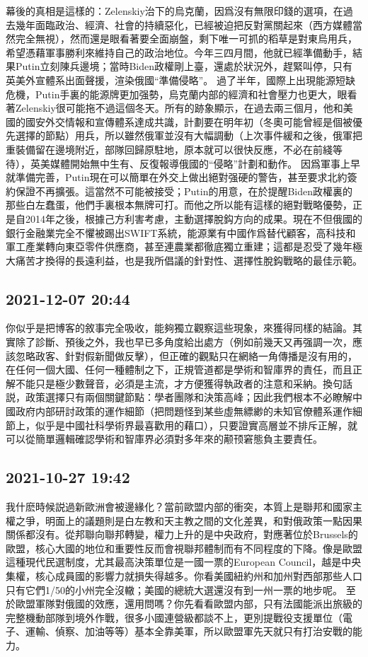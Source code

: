\documentclass[twocolumn]{ctexart}
\begin{document}
幕後的真相是這樣的：Zelenskiy治下的烏克蘭，因爲沒有無限印錢的選項，在過去幾年面臨政治、經濟、社會的持續惡化，已經被迫把反對黨關起來（西方媒體當然完全無視），然而還是眼看著要全面崩盤，剩下唯一可抓的稻草是對東烏用兵，希望憑藉軍事勝利來維持自己的政治地位。今年三四月間，他就已經準備動手，結果Putin立刻陳兵邊境；當時Biden政權剛上臺，還處於狀況外，趕緊叫停，只有英美外宣體系出面聲援，渲染俄國“準備侵略”。
過了半年，國際上出現能源短缺危機，Putin手裏的能源牌更加强勢，烏克蘭内部的經濟和社會壓力也更大，眼看著Zelenskiy很可能拖不過這個冬天。所有的跡象顯示，在過去兩三個月，他和美國的國安外交情報和宣傳體系達成共識，計劃要在明年初（冬奧可能曾經是個被優先選擇的節點）用兵，所以雖然俄軍並沒有大幅調動（上次事件緩和之後，俄軍把重裝備留在邊境附近，部隊回歸原駐地，原本就可以很快反應，不必在前綫等待），英美媒體開始無中生有、反復報導俄國的“侵略”計劃和動作。
因爲軍事上早就準備完善，Putin現在可以簡單在外交上做出絕對强硬的警告，甚至要求北約簽約保證不再擴張。這當然不可能被接受；Putin的用意，在於提醒Biden政權裏的那些白左蠢蛋，他們手裏根本無牌可打。而他之所以能有這樣的絕對戰略優勢，正是自2014年之後，根據己方利害考慮，主動選擇脫鈎方向的成果。現在不但俄國的銀行金融業完全不懼被踢出SWIFT系統，能源業有中國作爲替代顧客，高科技和軍工產業轉向東亞零件供應商，甚至連農業都徹底獨立重建；這都是忍受了幾年極大痛苦才換得的長遠利益，也是我所倡議的針對性、選擇性脫鈎戰略的最佳示範。
\subsection*{2021-12-07 20:44}

你似乎是把博客的敘事完全吸收，能夠獨立觀察這些現象，來獲得同樣的結論。其實除了診斷、預後之外，我也早已多角度給出處方（例如前幾天又再强調一次，應該忽略政客、針對假新聞做反擊），但正確的觀點只在網絡一角傳播是沒有用的，在任何一個大國、任何一種體制之下，正規管道都是學術和智庫界的責任，而且正解不能只是極少數聲音，必須是主流，才方便獲得執政者的注意和采納。換句話説，政策選擇只有兩個關鍵節點：學者團隊和決策高峰；因此我們根本不必瞭解中國政府内部研討政策的運作細節（把問題怪到某些虛無縹緲的未知官僚體系運作細節上，似乎是中國社科學術界最喜歡用的藉口），只要證實高層並不排斥正解，就可以從簡單邏輯確認學術和智庫界必須對多年來的颟顸窘態負主要責任。
\subsection*{2021-10-27 19:42}

我什麽時候説過新歐洲會被邊緣化？當前歐盟内部的衝突，本質上是聯邦和國家主權之爭，明面上的議題則是白左教和天主教之間的文化差異，和對俄政策一點因果關係都沒有。從邦聯向聯邦轉變，權力上升的是中央政府，對應著位於Brussels的歐盟，核心大國的地位和重要性反而會視聯邦體制而有不同程度的下降。像是歐盟這種現代民選制度，尤其最高決策單位是一國一票的European Council，越是中央集權，核心成員國的影響力就損失得越多。你看美國紐約州和加州對西部那些人口只有它們1/50的小州完全沒轍；美國的總統大選還沒有到一州一票的地步呢。
至於歐盟軍隊對俄國的效應，還用問嗎？你先看看歐盟内部，只有法國能派出旅級的完整機動部隊到境外作戰，很多小國連營級都談不上，更別提戰役支援單位（電子、運輸、偵察、加油等等）基本全靠美軍，所以歐盟軍先天就只有打治安戰的能力。
\end{document}
